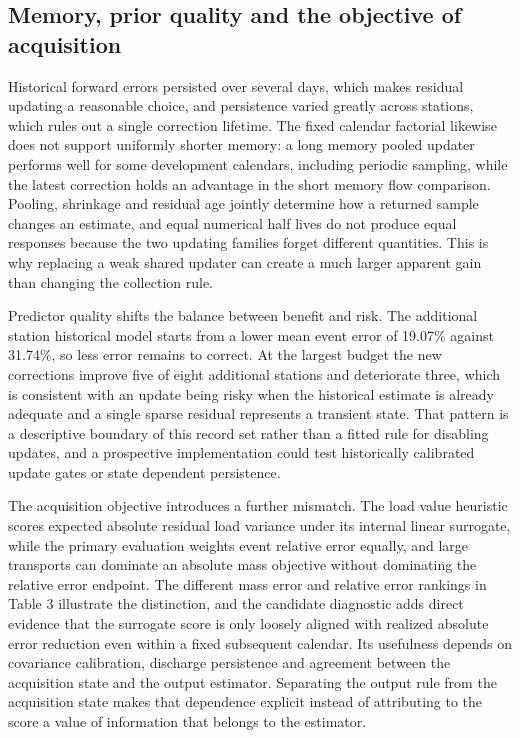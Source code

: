 \documentclass[lineno,pdflatex,sn-apa]{sn-jnl}%
\theoremstyle{thmstyleone}%
\theoremstyle{thmstyletwo}%
\theoremstyle{thmstylethree}%
\begin{document}
\subsection{Memory, prior quality and the objective of acquisition}

Historical forward errors persisted over several days, which makes residual updating a reasonable choice, and persistence varied greatly across stations, which rules out a single correction lifetime. The fixed calendar factorial likewise does not support uniformly shorter memory: a long memory pooled updater performs well for some development calendars, including periodic sampling, while the latest correction holds an advantage in the short memory flow comparison. Pooling, shrinkage and residual age jointly determine how a returned sample changes an estimate, and equal numerical half lives do not produce equal responses because the two updating families forget different quantities. This is why replacing a weak shared updater can create a much larger apparent gain than changing the collection rule.

Predictor quality shifts the balance between benefit and risk. The additional station historical model starts from a lower mean event error of 19.07\% against 31.74\%, so less error remains to correct. At the largest budget the new corrections improve five of eight additional stations and deteriorate three, which is consistent with an update being risky when the historical estimate is already adequate and a single sparse residual represents a transient state. That pattern is a descriptive boundary of this record set rather than a fitted rule for disabling updates, and a prospective implementation could test historically calibrated update gates or state dependent persistence.

The acquisition objective introduces a further mismatch. The load value heuristic scores expected absolute residual load variance under its internal linear surrogate, while the primary evaluation weights event relative error equally, and large transports can dominate an absolute mass objective without dominating the relative error endpoint. The different mass error and relative error rankings in Table 3 illustrate the distinction, and the candidate diagnostic adds direct evidence that the surrogate score is only loosely aligned with realized absolute error reduction even within a fixed subsequent calendar. Its usefulness depends on covariance calibration, discharge persistence and agreement between the acquisition state and the output estimator. Separating the output rule from the acquisition state makes that dependence explicit instead of attributing to the score a value of information that belongs to the estimator.
\end{document}

